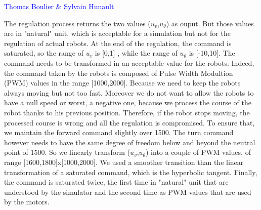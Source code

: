 \vspace*{0.5 cm}
\textcolor{blue} {Thomas Boulier \& Sylvain Hunault}
\vspace*{0.5cm}

The regulation process returns the two values ($u_v$,$u_{\theta}$) as ouput. But those values are in "natural" unit, which is acceptable for a simulation but not for the regulation of actual robots.
At the end of the regulation, the command is saturated, so the range of $u_v$ is [0,1] , while the range of $u_{\theta}$ is [-10,10].
The command needs to be transformed in an acceptable value for the robots.
Indeed, the command taken by the robots is composed of Pulse Width Modultion (PWM) values in the range [1000,2000]. Because we need to keep the robots always moving but not too fast. Moreover we do not want to allow the robots to have a null speed or worst, a negative one, because we process the course of the robot thanks to his previous position. Therefore, if the robot stops moving, the processed course is wrong and all the regulation is compromised.
To ensure that, we maintain the forward command slightly over 1500. The turn command however needs to have the same degree of freedom below and beyond the neutral point of 1500.
So we linearly transform  ($u_v$,$u_{\theta}$) into a couple of PWM values, of range [1600,1800]x[1000,2000]. 
We used a smoother transition than the linear transformation of a saturated command, which is the hyperbolic tangent.
Finally, the command is saturated twice, the first time in "natural" unit that are understood by the simulator and the second time as PWM values that are used by the motors.